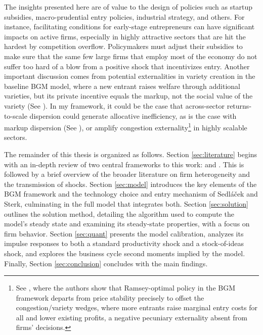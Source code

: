 \documentclass[a4paper,12pt]{article} %
\numberwithin{equation}{section} %
\numberwithin{figure}{section}
\numberwithin{table}{section}
\begin{document}
The insights presented here are of value to the design of policies such as startup subsidies, macro-prudential entry policies, industrial strategy, and others.
For instance, facilitating conditions for early-stage entrepreneurs can have significant impacts on active firms, especially in highly attractive sectors that are
hit the hardest by competition overflow. Policymakers must adjust their subsidies to make sure that the same few large firms that employ most of the economy do not
suffer too hard of a blow from a positive shock that incentivizes entry. Another important discussion comes from potential externalities in variety creation in the baseline BGM 
model, where a new entrant raises welfare through additional varieties, but its private incentive equals the markup, not the social value of the variety 
(See \cite{bilbiie2019monopoly}). In my framework, it could be the case that across-sector returns-to-scale dispersion could generate allocative inefficiency, 
as is the case with markup dispersion (See \cite{baqaee2020productivity}), or amplify congestion 
externality\footnote{ See \textcite{bilbiie2014optimal}, where the authors show that Ramsey-optimal policy in the BGM framework departs from
price stability precisely to offset the congestion/variety wedges, where more entrants raise marginal entry costs for all and lower existing profits, a 
negative pecuniary externality absent from firms' decisions.} in highly scalable sectors. 

The remainder of this thesis is organized as follows. Section \ref{sec:literature} begins with an in-depth review of two central frameworks 
to this work: \textcite{bilbiie2012endogenous} and \textcite{sedlavcek2017growth}. This is followed by a brief overview of the broader literature 
on firm heterogeneity and the transmission of shocks. Section \ref{sec:model} introduces the key elements of the BGM framework and the technology 
choice and entry mechanism of Sedláček and Sterk, culminating in the full model that integrates both. Section \ref{sec:solution} outlines the 
solution method, detailing the algorithm used to compute the model’s steady state and examining its steady-state properties, with a focus on firm 
behavior. Section \ref{sec:quant} presents the model calibration, analyzes its impulse responses to both a standard productivity shock and a 
stock-of-ideas shock, and explores the business cycle second moments implied by the model. Finally, Section \ref{sec:conclusion} 
concludes with the main findings.


\end{document}
